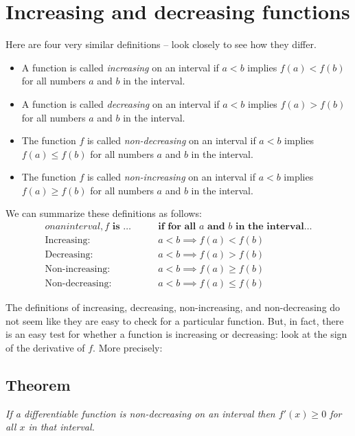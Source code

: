 \section{Increasing and decreasing functions} %
Here are four very similar definitions -- look closely to see how they differ.
\begin{itemize}
\item A function is called \emph{increasing} on an interval if $a<b$ implies
  $f(a)<f(b)$ for all numbers $a$ and $b$ in the interval.

\item A function is called \emph{decreasing} on an interval if $a<b$ implies $f(a)>f(b)$ for
  all numbers $a$ and $b$ in the interval.

\item The function $f $ is called \emph{non-decreasing} on an interval if $a<b$ implies
  $f(a)\leq f(b)$ for all numbers $a$ and $b$ in the interval.




\item The function $f $ is called \emph{non-increasing} on an interval if $a<b$ implies
  $f(a)\geq f(b)$ for all numbers $a$ and $b$ in the interval.
\end{itemize}
We can summarize these definitions as follows:
\begin{align*}
 on an interval, \textbf{$f$ is \ldots}\quad\quad&
                           \textbf{if for all $a$ and $b$ in the interval\ldots}\\
  \text{Increasing:}\quad & a<b \implies f(a)<f(b) \\
  \text{Decreasing:}\quad & a<b \implies f(a)>f(b) \\
  \text{Non-increasing:}\quad & a<b \implies f(a)\geq f(b) \\
  \text{Non-decreasing:}\quad & a<b \implies f(a)\leq f(b)
\end{align*}




The definitions of increasing, decreasing, non-increasing, and non-decreasing do
not seem like they are easy to check for a particular function.  But, in fact,
there is an easy test for whether a function is increasing or decreasing: look
at the sign of the derivative of $f$.  More precisely:




\subsection{Theorem}\label{thm:increasing-implies-deriv-pos} %
\itshape If a differentiable function is non-decreasing on an interval then
$f'(x)\geq 0$ for all $x$ in that interval.

